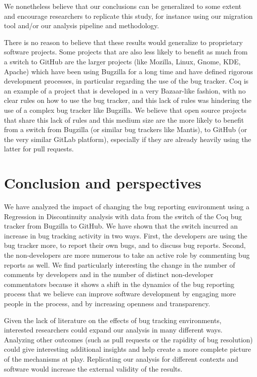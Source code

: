 \documentclass[conference]{IEEEtran}
\begin{document}
We nonetheless believe that our conclusions can be generalized to some extent and encourage researchers to replicate this study, for instance using our migration tool and/or our analysis pipeline and methodology.

There is no reason to believe that these results would generalize to proprietary software projects. Some projects that are also less likely to benefit as much from a switch to GitHub are the larger projects (like Mozilla, Linux, Gnome, KDE, Apache) which have been using Bugzilla for a long time and have defined rigorous development processes, in particular regarding the use of the bug tracker. Coq is an example of a project that is developed in a very Bazaar-like fashion, with no clear rules on how to use the bug tracker, and this lack of rules was hindering the use of a complex bug tracker like Bugzilla. We believe that open source projects that share this lack of rules and this medium size are the more likely to benefit from a switch from Bugzilla (or similar bug trackers like Mantis), to GitHub (or the very similar GitLab platform), especially if they are already heavily using the latter for pull requests.

\section{Conclusion and perspectives}
\label{conclusion}
We have analyzed the impact of changing the bug reporting environment using a Regression in Discontinuity analysis with data from the switch of the Coq bug tracker from Bugzilla to GitHub.  We have shown that the switch incurred an increase in bug tracking activity in two ways. First, the developers are using the bug tracker more, to report their own bugs, and to discuss bug reports. Second, the non-developers are more numerous to take an active role by commenting bug reports as well. We find particularly interesting the change in the number of comments by developers and in the number of distinct non-developer commentators because it shows a shift in the dynamics of the bug reporting process that we believe can improve software development by engaging more people in the process, and by increasing openness and transparency.

Given the lack of literature on the effects of bug tracking environments, interested researchers could expand our analysis in many different ways. Analyzing other outcomes (such as pull requests or the rapidity of bug resolution) could give interesting additional insights and help create a more complete picture of the mechanisms at play.
Replicating our analysis for different contexts and software would increase the external validity of the results.
\end{document}
